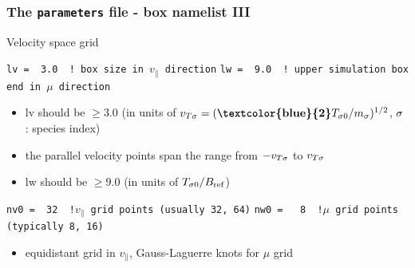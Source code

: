 \documentclass[10pt]{beamer}
\newcommand{\cB}[1]{\textcolor{blue}{#1}}
\begin{document}
\begin{frame}[fragile]
  \frametitle{The {\tt parameters} file - box namelist III}
\begin{block}{Velocity space grid}
\begin{block}

\verb|lv =  3.0  ! box size in |$v_\parallel$\verb| direction|
\verb|lw =  9.0  ! upper simulation box end in |$\mu$\verb| direction|
\end{block}

\begin{itemize}
\item lv should be $\geq 3.0$ (in units of $v_{T\spec}=(\textbf{\cB{2}}T_{\spec 0}/m_\spec)^{1/2}$, $\sigma$ : species index)
\item the parallel velocity points span the range from $-v_{T\sigma}$ to $v_{T\sigma}$
\item lw should be $\geq 9.0$ (in units of $T_{\sigma 0}/B_{\rm ref}$)
\end{itemize}
\begin{block}

\verb|nv0 =  32  !|$v_\parallel$\verb| grid points (usually 32, 64)|
\verb|nw0 =   8  !|$\mu$\verb| grid points (typically 8, 16) |
\end{block}
\begin{itemize}
\item equidistant grid in $v_\|$, Gauss-Laguerre knots for $\mu$ grid
\end{itemize}

\end{block}

\end{frame}


\end{document}
